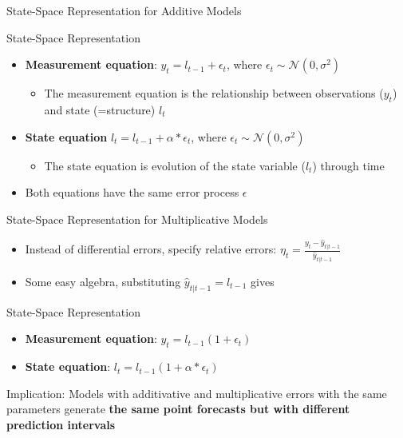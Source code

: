 \documentclass{beamer}
\begin{document}
\begin{frame}{State-Space Representation for Additive Models}
  \begin{block}{State-Space Representation}
    \begin{itemize}
    \item \textbf{Measurement equation}: $y_t = l_{t-1} + \epsilon_t$, where $\epsilon_t \sim \mathcal{N}(0, \sigma^2)$
      \begin{itemize}
      \item The measurement equation is the relationship between observations ($y_t$) and state (=structure) $l_t$
      \end{itemize}
    \item \textbf{State equation} $l_t = l_{t-1} + \alpha*\epsilon_t$, where $\epsilon_t \sim \mathcal{N}(0, \sigma^2)$
      \begin{itemize}
      \item The state equation is evolution of the state variable ($l_t$) through time
      \end{itemize}
     \end{itemize}
  \end{block}


  \begin{itemize}
  \item Both equations have the same error process $\epsilon$
  \end{itemize}
  
\end{frame}


\begin{frame}{State-Space Representation for Multiplicative Models}
  \begin{itemize}
  \item Instead of differential errors, specify relative errors: $\eta_t = \frac{y_t - \hat{y}_{t|t-1}}{ \hat{y}_{t|t-1}}$
  \item Some easy algebra, substituting $\hat{y}_{t|t-1} = l_{t-1}$ gives   
  \end{itemize}

  \begin{block}{State-Space Representation}
    \begin{itemize}
    \item \textbf{Measurement equation}: $y_t = l_{t-1}(1+\epsilon_t)$
    \item \textbf{State equation}: $l_t = l_{t-1}(1+\alpha*\epsilon_t)$
    \end{itemize}
  \end{block}

Implication: Models with additivative and multiplicative errors with the same parameters generate \textbf{the same point forecasts but with different prediction intervals}
  
\end{frame}
\end{document}
